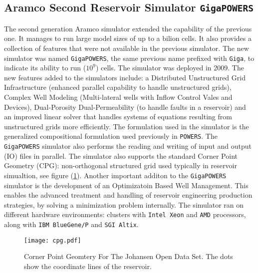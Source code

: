 \documentclass[barcolor=BrickRed,nocopyright,nolists]{asmejour}
\begin{document}
\subsection{Aramco Second Reservoir Simulator \texttt{GigaPOWERS}}
The second generation Aramco simulator extended the capability of the previous one. It manages to run large model sizes of up to a bilion cells. It also provides a collection of features that were not available in the previous simulator. The new simulator was named \texttt{GigaPOWERS}, the same previous name prefixed with \texttt{Giga}, to indicate its 
ability to run ($10^{9}$) cells. The simulator was deployed in 2009\cite{spe119272}. The new features added to the simulators include: a Distributed Unstructured Grid Infrastructure (enhanced parallel capability to handle unstructured grids), Complex Well Modeling (Multi-lateral wells with Inflow Control Vales and Devices), Dual-Porosity Dual-Permeability
(to handle faults in a reservoir) and an improved linear solver that handles systems of equations resulting from unstructured grids more efficiently. The formulation used in the simulator is the generalized compositional formulation used previously in \texttt{POWERS}. The \texttt{GigaPOWERS} simulator also performs the reading and writing of input and output
(IO) files in parallel. The simulator also supports the standard Corner Point Geometry (CPG): non-orthogonal structured grid used typically in reservoir simualtion, see figure (\ref{cpg}). Another important additon to the \texttt{GigaPOWERS} simulator is the development of an Optimizatoin Based Well Management. This enables the advanced treatment and handling of reservoir engineering
production strategies, by solving a minimization problem internally. The simulator ran on different hardware environments: clusters with \texttt{Intel Xeon} and \texttt{AMD} processors, along with \texttt{IBM BlueGene/P} and \texttt{SGI Altix}.
\begin{figure}[h]
	\texttt{[image: cpg.pdf]}
	\caption{Corner Point Geomtery For The Johansen Open Data Set. The dots show the coordinate lines of the reservoir\cite{johansen}.}
	\label{cpg}
\end{figure}
\end{document}
